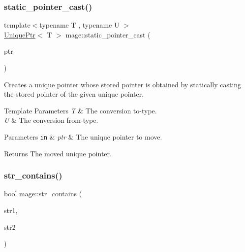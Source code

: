 \subsubsection{\texorpdfstring{static\+\_\+pointer\+\_\+cast()}{static\_pointer\_cast()}}
{\footnotesize\ttfamily template$<$typename T , typename U $>$ \\
\hyperlink{namespacemage_a8c307fbcc33bce9b7f2aa4c26c3b95cf}{Unique\+Ptr}$<$ T $>$ mage\+::static\+\_\+pointer\+\_\+cast (\begin{DoxyParamCaption}\item[{\hyperlink{namespacemage_a8c307fbcc33bce9b7f2aa4c26c3b95cf}{Unique\+Ptr}$<$ U $>$ \&\&}]{ptr }\end{DoxyParamCaption})\hspace{0.3cm}{\ttfamily [noexcept]}}

Creates a unique pointer whose stored pointer is obtained by statically casting the stored pointer of the given unique pointer.


\begin{DoxyTemplParams}{Template Parameters}
{\em T} & The conversion to-\/type. \\
\hline
{\em U} & The conversion from-\/type. \\
\hline
\end{DoxyTemplParams}

\begin{DoxyParams}[1]{Parameters}
\mbox{\tt in}  & {\em ptr} & The unique pointer to move. \\
\hline
\end{DoxyParams}
\begin{DoxyReturn}{Returns}
The moved unique pointer. 
\end{DoxyReturn}
\hypertarget{namespacemage_a22965dd02291bbb3a4a142ee50ebd282}{}\label{namespacemage_a22965dd02291bbb3a4a142ee50ebd282} 
\subsubsection{\texorpdfstring{str\+\_\+contains()}{str\_contains()}\hspace{0.1cm}{\footnotesize\ttfamily [1/4]}}
{\footnotesize\ttfamily bool mage\+::str\+\_\+contains (\begin{DoxyParamCaption}\item[{const char $\ast$}]{str1,  }\item[{const char $\ast$}]{str2 }\end{DoxyParamCaption})\hspace{0.3cm}{\ttfamily [noexcept]}}

